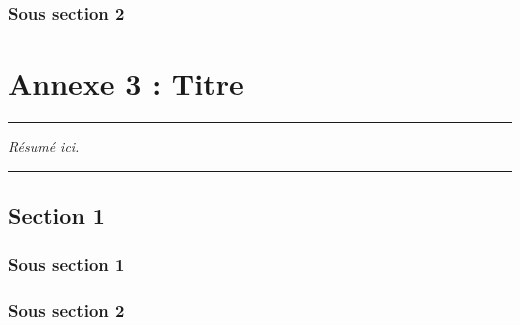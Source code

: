 \subsection{Sous section 2}
\blindtext



\FloatBarrier
\chapter{Annexe 3 : Titre}
\label{Ann:3}


\begin{center}
\rule{0.7\linewidth}{.5pt}
\begin{minipage}{0.7\linewidth}
\smallskip

\textit{Résumé ici.
}

\end{minipage}
\smallskip
\rule{0.7\linewidth}{.5pt}
\end{center}

\minitoc
\newpage

\section{Section 1}
\subsection{Sous section 1}
\blindtext
\subsection{Sous section 2}
\blindtext



